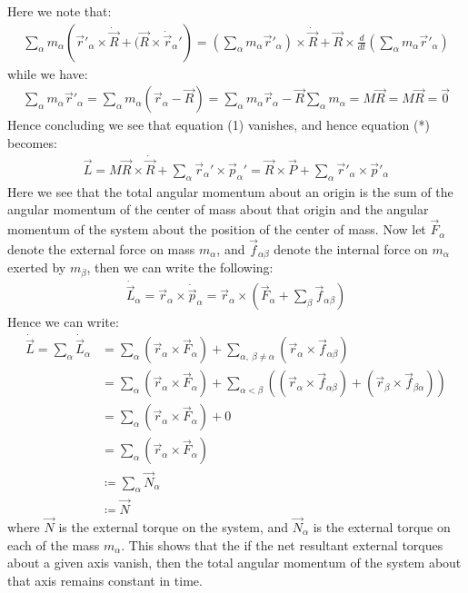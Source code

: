 \documentclass[11pt,oneside]{book}
\theoremstyle{break}
\theoremstyle{break}
\begin{document}
Here we note that:
\begin{align*}
\sum_{\alpha}m_{\alpha}\left(\vec{r}'_{\alpha}\times \dot{\vec{R}} + (\vec{R}\times \dot{\vec{r}}_{\alpha}'\right) = \left( \sum_{\alpha}m_{\alpha} \vec{r}'_{\alpha}\right) \times \dot{\vec{R}} + \vec{R}\times \frac{d}{dt}\left( \sum_{\alpha}m_{\alpha} \vec{r}'_{\alpha}\right) \tag{1}
\end{align*}
while we have:
\begin{align*}
\sum_{\alpha}m_{\alpha}\vec{r}'_{\alpha} = \sum_{\alpha}m_{\alpha}(\vec{r}_{\alpha} - \vec{R}) = \sum_{\alpha}m_{\alpha}\vec{r}_{\alpha} - \vec{R}\sum_{\alpha}m_{\alpha} = M\vec{R} = M\vec{R} = \vec{0}
\end{align*}
Hence concluding we see that equation (1) vanishes, and hence equation (*) becomes:
\begin{align*}
\vec{L} = M \vec{R}\times \dot{\vec{R}} + \sum_{\alpha}\vec{r}_{\alpha}' \times \vec{p}_{\alpha}' = \vec{R}\times \vec{P} + \sum_{\alpha}\vec{r}'_{\alpha} \times \vec{p}'_{\alpha}
\end{align*}
Here we see that the total angular momentum about an origin is the sum of the angular momentum of the center of mass about that origin and the angular momentum of the system about the position of the center of mass. Now let $\vec{F}_{\alpha}$ denote the external force on mass $m_\alpha$, and $\vec{f}_{\alpha\beta}$ denote the internal force on $m_\alpha$ exerted by $m_{\beta}$, then we can write the following:
\begin{align*}
\dot{\vec{L}}_{\alpha} = \vec{r}_{\alpha}\times \dot{\vec{p}}_{\alpha} = \vec{r}_{\alpha}\times \left( \vec{F}_{\alpha}+ \sum_{\beta}\vec{f}_{\alpha\beta}\right)
\end{align*}
Hence we can write:
\begin{align*}
\dot{\vec{L}} = \sum_{\alpha}\dot{\vec{L}}_{\alpha} 
&= \sum_{\alpha}\left(\vec{r}_{\alpha}\times \vec{F}_{\alpha}\right)+\sum_{\alpha,\ \beta \neq \alpha}\left(\vec{r}_{\alpha}\times \vec{f}_{\alpha\beta}\right) \\
&=\sum_{\alpha}\left(\vec{r}_{\alpha}\times \vec{F}_{\alpha}\right)+\sum_{\alpha< \beta}\left((\vec{r}_{\alpha}\times \vec{f}_{\alpha\beta}) + (\vec{r}_{\beta}\times \vec{f}_{\beta\alpha})\right)\\
&=  \sum_{\alpha}\left(\vec{r}_{\alpha}\times \vec{F}_{\alpha}\right)+0\\
&=\sum_{\alpha}\left(\vec{r}_{\alpha}\times \vec{F}_{\alpha}\right)\\
&\coloneqq \sum_{\alpha}\vec{N}_{\alpha} \\
&\coloneqq \vec{N}
\end{align*}
where $\vec{N}$ is the external torque on the system, and $\vec{N}_{\alpha}$ is the external torque on each of the mass $m_{\alpha}$. This shows that the if the net resultant external torques about a given axis vanish, then the total angular momentum of the system about that axis remains constant in time. \\
\end{document}
